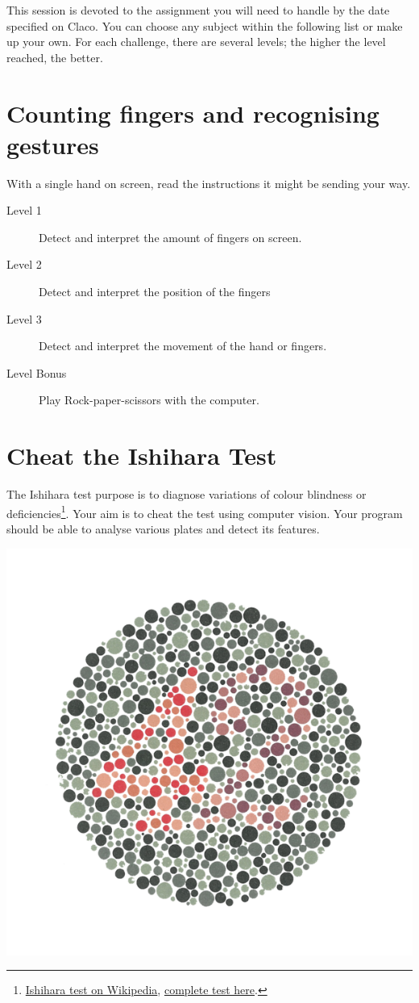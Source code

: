 \documentclass{labo}
\author{}
\begin{document}

This session is devoted to the assignment you will need to handle by the date specified on Claco.
You can choose any subject within the following list or make up your own.
For each challenge, there are several levels; the higher the level reached, the better.


\section*{Counting fingers and recognising gestures}
With a single hand on screen, read the instructions it might be sending your way.

\begin{description}
	\item[Level 1] Detect and interpret the amount of fingers on screen.
	\item[Level 2] Detect and interpret the position of the fingers \faHandPeaceO \faHandSpockO \faHandScissorsO
	\item[Level 3] Detect and interpret the movement of the hand or fingers.
	\item[Level Bonus] Play Rock-paper-scissors with the computer.
\end{description}


\section*{Cheat the Ishihara Test}
The Ishihara test purpose is to diagnose variations of colour blindness or deficiencies\footnote{\href{https://en.wikipedia.org/wiki/Ishihara\_test}{Ishihara test on Wikipedia}, \href{http://daltonien.free.fr/daltonien/article.php3?id_article=6}{complete test here}.}.
Your aim is to cheat the test using computer vision. Your program should be able to analyse various plates and detect its features.

\begin{center}
\includegraphics[width=.4\textwidth]{Ishihara_23.PNG}
\end{center}
\end{document}
